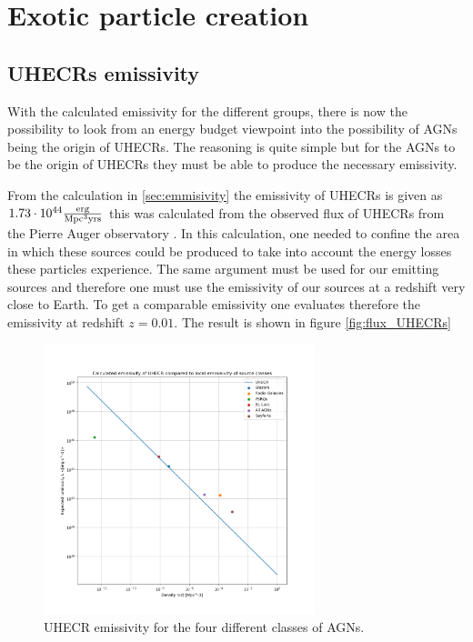 \section{Exotic particle creation}
\subsection{UHECRs emissivity}
With the calculated emissivity for the different groups, there is now the possibility to look from an energy budget viewpoint into the possibility of AGNs being the origin of UHECRs. The 
reasoning is quite simple but for the AGNs to be the origin of UHECRs they must be able to produce the necessary emissivity. 

From the calculation in \ref{sec:emmisivity} the emissivity of UHECRs is given as $1.73 \cdot 10^{44}\frac{\rm erg}{\rm Mpc^3yr \rm s }$ this was calculated from the observed flux of UHECRs from the Pierre Auger observatory \cite{thepierreaugercollaboration2017pierre}.
In this calculation, one needed to confine the area in which these sources could be produced to take into account the energy losses these particles experience. The same argument must be used 
for our emitting sources and therefore one must use the emissivity of our sources at a redshift very close to Earth. To get a comparable emissivity one evaluates therefore the emissivity at redshift $z=0.01$. The result is shown in figure \ref*{fig:flux_UHECRs}

\begin{figure}[H]
    \centering
    \includegraphics[width = 0.7\textwidth]{new_plots/L_n_uhecr_calc.png}
    \caption{UHECR emissivity for the four different classes of AGNs.}
    \label{fig:UHECR}
\end{figure}

